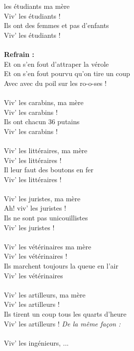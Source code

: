 
 les étudiants ma mère
\\Viv' les étudiants !
\\Ils ont des femmes et pas d'enfants
\\Viv' les étudiants !
\\\\\textbf{Refrain :}
\\Et on s'en fout d'attraper la vérole
\\Et on s'en fout pourvu qu'on tire un coup
\\Avec avec du poil sur les ro-o-ses !
\\\\Viv' les carabins, ma mère
\\Viv' les carabins !
\\Ils ont chacun 36 putains
\\Viv' les carabins !
\\\\Viv' les littéraires, ma mère
\\Viv' les littéraires !
\\Il leur faut des boutons en fer
\\Viv' les littéraires !
\\\\Viv' les juristes, ma mère
\\Ah! viv' les juristes !
\\Ils ne sont pas unicouillistes
\\Viv' les juristes !
\\\\Viv' les vétérinaires ma mère
\\Viv' les vétérinaires !
\\Ils marchent toujours la queue en l'air
\\Viv' les vétérinaires
\\\\Viv' les artilleurs, ma mère
\\Viv' les artilleurs !
\\Ils tirent un coup tous les quarts d'heure
\\Viv' les artilleurs !
\breakpage
\textit{De la même façon :}
\\\\Viv' les ingénieurs, ...
